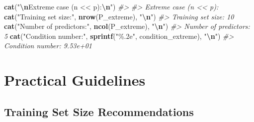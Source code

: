 \documentclass[
]{article}
\newenvironment{Shaded}{\begin{snugshade}}{\end{snugshade}}
\newcommand{\CommentTok}[1]{\textcolor[rgb]{0.56,0.35,0.01}{\textit{#1}}}
\newcommand{\FunctionTok}[1]{\textcolor[rgb]{0.13,0.29,0.53}{\textbf{#1}}}
\newcommand{\NormalTok}[1]{#1}
\newcommand{\SpecialCharTok}[1]{\textcolor[rgb]{0.81,0.36,0.00}{\textbf{#1}}}
\newcommand{\StringTok}[1]{\textcolor[rgb]{0.31,0.60,0.02}{#1}}
\begin{document}
\begin{Shaded}
\begin{Highlighting}[]
\FunctionTok{cat}\NormalTok{(}\StringTok{"}\SpecialCharTok{\textbackslash{}n}\StringTok{Extreme case (n \textless{}\textless{} p):}\SpecialCharTok{\textbackslash{}n}\StringTok{"}\NormalTok{)}
\CommentTok{\#\textgreater{} }
\CommentTok{\#\textgreater{} Extreme case (n \textless{}\textless{} p):}
\FunctionTok{cat}\NormalTok{(}\StringTok{"Training set size:"}\NormalTok{, }\FunctionTok{nrow}\NormalTok{(P\_extreme), }\StringTok{"}\SpecialCharTok{\textbackslash{}n}\StringTok{"}\NormalTok{)}
\CommentTok{\#\textgreater{} Training set size: 10}
\FunctionTok{cat}\NormalTok{(}\StringTok{"Number of predictors:"}\NormalTok{, }\FunctionTok{ncol}\NormalTok{(P\_extreme), }\StringTok{"}\SpecialCharTok{\textbackslash{}n}\StringTok{"}\NormalTok{)}
\CommentTok{\#\textgreater{} Number of predictors: 5}
\FunctionTok{cat}\NormalTok{(}\StringTok{"Condition number:"}\NormalTok{, }\FunctionTok{sprintf}\NormalTok{(}\StringTok{"\%.2e"}\NormalTok{, condition\_extreme), }\StringTok{"}\SpecialCharTok{\textbackslash{}n}\StringTok{"}\NormalTok{)}
\CommentTok{\#\textgreater{} Condition number: 9.53e+01}
\end{Highlighting}
\end{Shaded}

\section{Practical Guidelines}\label{practical-guidelines}

\subsection{Training Set Size
Recommendations}\label{training-set-size-recommendations}
\end{document}
